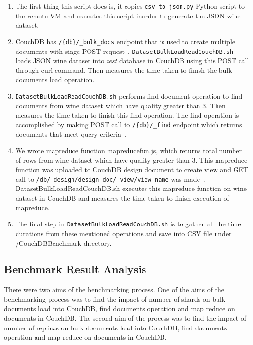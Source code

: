 \begin{enumerate}
  \item The first thing this script does is, it copies
    \verb|csv_to_json.py| Python script to the remote VM and executes
    this script inorder to generate the JSON wine dataset.
  \item CouchDB has \verb|/{db}/_bulk_docs| endpoint that is used to
    create multiple documents with singe POST
    request~\cite{www-CouchdbBulkApi}. \verb|DatasetBulkLoadReadCouchDB.sh|
    loads JSON wine dataset into \emph{test} database in CouchDB  using 
    this POST call through curl command. Then measures the time taken
    to finish the bulk documents load operation.

  \item \verb|DatasetBulkLoadReadCouchDB.sh| performs find document operation
    to find documents from wine dataset which have quality greater
    than 3. Then measures the time taken to finish this find
    operation. The find operation is accomplished by making POST call
    to \verb|/{db}/_find| endpoint which returns documents that meet
    query criteria~\cite{www-CouchdbFind}. 

  \item We wrote mapreduce function mapreducefun.js, which returns
    total number of rows from wine dataset which have quality greater
    than 3. This mapreduce function was uploaded to CouchDB design
    document to create view and GET call to
    \verb|/db/_design/design-doc/_view/view-name| was
    made~\cite{www-CouchdbView}. DatasetBulkLoadReadCouchDB.sh
    executes this mapreduce function on wine dataset in CouchDB and
    measures the time taken to finish execution of mapreduce.

  \item The final step in \verb|DatasetBulkLoadReadCouchDB.sh| is to
    gather all the time durations from these mentioned operations and
    save into CSV file under /CouchDBBenchmark directory.

\end{enumerate}

\subsection{Benchmark Result Analysis}
There were two aims of the benchmarking process. One
of the aims of the benchmarking process was to find the impact of
number of shards on bulk documents load into CouchDB, find documents
operation and map reduce on documents in CouchDB. The second aim of
the process was to find the impact of number of replicas on bulk
documents load into CouchDB, find documents operation and map reduce
on documents in CouchDB. 

